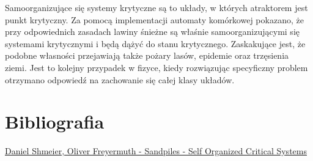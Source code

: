 \documentclass{article}
\begin{document}
	Samoorganizujące się systemy krytyczne są to układy, w których atraktorem jest punkt krytyczny. Za pomocą implementacji automaty komórkowej pokazano,  że przy odpowiednich zasadach lawiny śnieżne są właśnie samoorganizującymi się systemami krytycznymi i będą dążyć do stanu krytycznego. Zaskakujące jest, że podobne własności przejawiają także pożary lasów, epidemie oraz trzęsienia ziemi. Jest to kolejny przypadek w fizyce, kiedy rozwiązując specyficzny problem otrzymano odpowiedź na zachowanie się całej klasy układów.

\section{Bibliografia}

	\href {http://www.hiskp.uni-bonn.de/uploads/media/sandpiles.pdf}{Daniel Shmeier, Oliver Freyermuth - Sandpiles - Self Organized Critical Systems}
	
\end{document}
